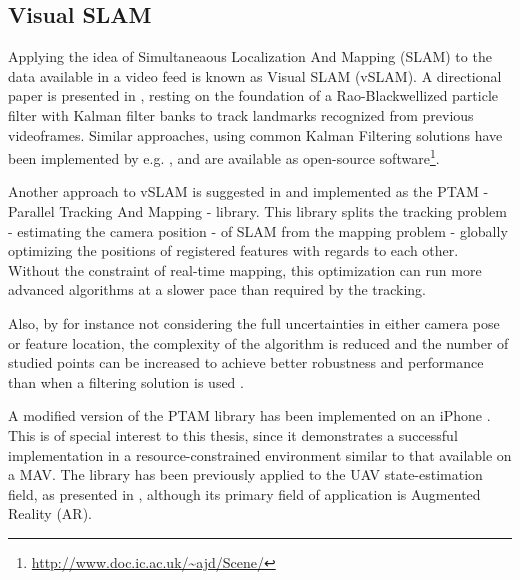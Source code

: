     \subsection{Visual SLAM}
    Applying the idea of Simultaneaous Localization And Mapping (SLAM)
    to the data available in a video feed is known as Visual SLAM (vSLAM).
    A directional paper is presented in \citep{Karlsson05thevslam}, resting on the
    foundation of a Rao-Blackwellized particle filter with Kalman filter banks
    to track landmarks recognized from previous videoframes.
    Similar approaches, using common Kalman Filtering solutions have been implemented by e.g. \citep{DBLP:conf/iccv/Davison03,Eade:2006:SMS:1153170.1153506},
    and are available as open-source software\footnote{\url{http://www.doc.ic.ac.uk/~ajd/Scene/}}.

    Another approach to vSLAM is suggested in \citep{klein07parallel} and
    implemented as the PTAM - Parallel Tracking And Mapping - library.
    This library splits the tracking problem - estimating the camera position -
    of SLAM from the mapping problem - globally optimizing the positions of
    registered features with regards to each other.
    Without the constraint of real-time mapping, this optimization can run
    more advanced algorithms at a slower pace than required by the tracking.

    Also, by for instance not considering the full uncertainties in either camera pose or feature location,
    the complexity of the algorithm is reduced and the number of studied points
    can be increased to achieve better robustness and
    performance than when a filtering solution is used \citep{DBLP:conf/icra/StrasdatMD10}.

    A modified version of the PTAM library has been implemented on an iPhone \citep{klein09cameraphone}.
    This is of special interest to this thesis, since it demonstrates
    a successful implementation in a resource-constrained environment similar to that available on a MAV.
    The library has been previously applied to the UAV state-estimation field, as presented in \citep{weiss11monocular},
    although its primary field of application is Augmented Reality (AR).

